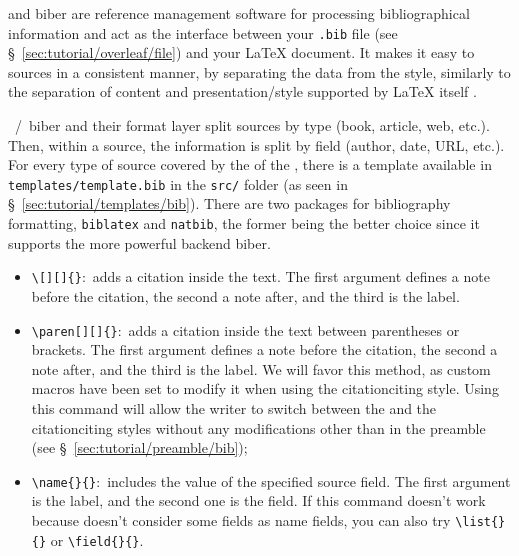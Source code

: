  and biber are \gls{reference} management software for processing bibliographical information and act as the interface between your \texttt{.bib} file (see \S~\ref{sec:tutorial/overleaf/file}) and your \LaTeX{} document. It makes it easy to  \glspl{source} in a consistent manner, by separating the data from the style, similarly to the separation of content and presentation/style supported by \LaTeX{} itself \parencite{web:bibtex-wiki}.

~/~biber and their format layer \BibLaTeX{} split \glspl{source} by type (book, article, web, etc.). Then, within a \gls{source}, the information is split by field (author, date, \gls{URL}, etc.). For every type of \gls{source} covered by the  of the  \parencites{report:udes-writing-guide}, there is a template available in \texttt{templates/template.bib} in the \texttt{src/} folder (as seen in \S~\ref{sec:tutorial/templates/bib}). There are two \glspl{package} for bibliography formatting, \texttt{biblatex} and \texttt{natbib}, the former being the better choice since it supports the more powerful backend biber.

\begin{itemize}
    \item \texttt{\textbackslash{}[][]\{\}}:~adds a \gls{citation} inside the text. The first \gls{argument} defines a note before the \gls{citation}, the second a note after, and the third is the \gls{label}.
    \item \texttt{\textbackslash{}paren[][]\{\}}:~adds a \gls{citation} inside the text between parentheses or brackets. The first argument defines a note before the \gls{citation}, the second a note after, and the third is the \gls{label}. We will favor this method, as custom \glspl{macro} have been set to modify it when using the  \gls{citation}{citing} style. Using this \gls{command} will allow the writer to switch between the  and the  \gls{citation}{citing} styles without any modifications other than in the preamble (see \S~\ref{sec:tutorial/preamble/bib});
    \item \texttt{\textbackslash{}name\{\}\{\}}:~includes the \gls{value} of the specified \gls{source} field. The first argument is the \gls{label}, and the second one is the field. If this \gls{command} doesn't work because \BibLaTeX{} doesn't consider some fields as name fields, you can also try \texttt{\textbackslash{}list\{\}\{\}} or \texttt{\textbackslash{}field\{\}\{\}}.
\end{itemize}

